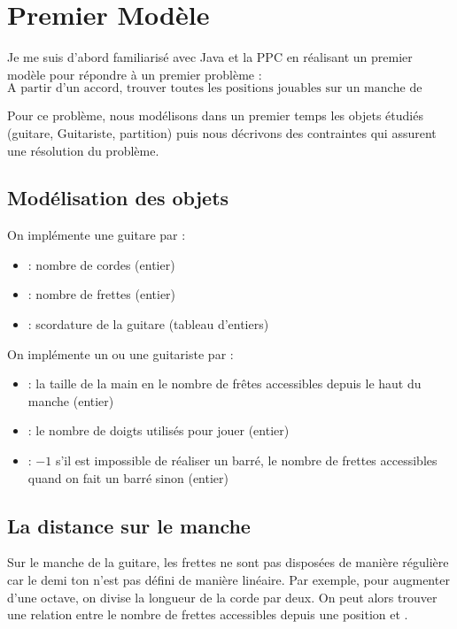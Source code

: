 \section{Premier Modèle}
\label{sec:PremierModel}

Je me suis d'abord familiarisé avec Java et la PPC en réalisant un
premier modèle pour répondre à un premier problème :
\[\text{A partir d'un accord, trouver toutes les positions jouables sur un 
manche de guitare.}\]

Pour ce problème, nous modélisons dans un premier temps les objets
étudiés (guitare, Guitariste, partition) puis nous décrivons des contraintes
qui assurent une résolution du problème.

\subsection{Modélisation des objets}
\label{subsec:ModelGuitare}

On implémente une guitare par :
\begin{itemize}
  \item \nbCordes : nombre de cordes (entier)
  \item \nbFrettes : nombre de frettes (entier)
  \item \scordature : scordature de la guitare (tableau d'entiers)
\end{itemize}

On implémente un ou une guitariste par :
\begin{itemize}
  \item \tailleMain : la taille de la main en le nombre de frêtes accessibles
    depuis le haut du manche (entier)
	\item \nbDoigtsUtil : le nombre de doigts utilisés pour jouer (entier)
	\item \isBarre : $-1$ s'il est impossible de réaliser un barré, le
  nombre de frettes accessibles quand on fait un barré sinon (entier)
\end{itemize}

\subsection{La distance sur le manche}
\label{subse:distanceManche}

Sur le manche de la guitare, les frettes ne sont pas disposées de manière
régulière car le demi ton n'est pas défini de manière linéaire.
Par exemple, pour augmenter d'une octave, on divise la longueur de la
corde par deux. On peut alors trouver une relation entre le nombre de frettes
accessibles depuis une position et \tailleMain.

